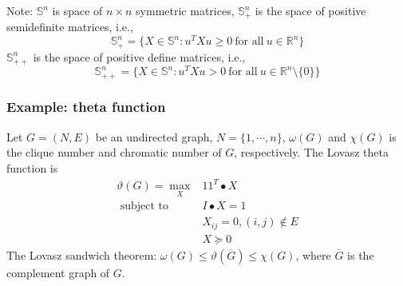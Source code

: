 \documentclass[a4paper]{article}
\begin{document}
{Note: $\mathbb{S}^n$ is space of $n \times n$ symmetric matrices, $\mathbb{S}^n_+$ is the space of positive semidefinite matrices, i.e.,
\begin{equation}
  \mathbb{S}^n_+ = \{ X \in \mathbb{S}^n : u^TXu \geq 0 \ \text{for all} \ u \in \mathbb{R}^n \} \nonumber
\end{equation}
$\mathbb{S}^n_{++}$ is the space of positive define matrices, i.e.,
\begin{equation}
  \mathbb{S}^n_{++} = \{ X \in \mathbb{S}^n : u^TXu > 0 \ \text{for all} \ u \in \mathbb{R}^n \setminus \{ 0\} \} \nonumber
\end{equation}

\subsubsection{Example: theta function}
Let $G = (N, E)$ be an undirected graph, $N = \{1,\cdots, n\}$, $\omega(G)$ and $\chi (G)$ is the clique number and chromatic number of $G$, respectively. The Lovasz theta function is 
\begin{equation}
  \begin{array}{ll}
    \vartheta (G) = \max\limits_{X} & 11^T \bullet X \\
    \text { subject to } & I \bullet X = 1\\ \nonumber
    & X_{ij} = 0, (i,j) \notin E \\
    & X \succeq 0
\end{array} 
\end{equation}
The Lovasz sandwich theorem: $\omega(G) \leq \vartheta(\overline{G}) \leq \chi (G)$, where $\overline{G} $ is the complement graph of $G$.

}
\end{document}
